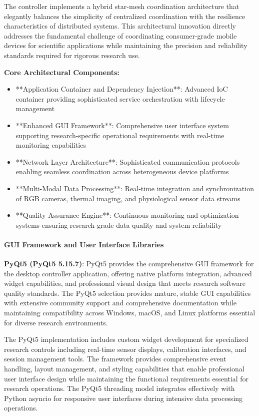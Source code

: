 \documentclass[12pt,a4paper]{report}
\begin{document}
The controller implements a hybrid star-mesh coordination architecture that elegantly balances the simplicity of
centralized coordination with the resilience characteristics of distributed systems. This architectural innovation
directly addresses the fundamental challenge of coordinating consumer-grade mobile devices for scientific applications
while maintaining the precision and reliability standards required for rigorous research use.

\textbf{Core Architectural Components:}

\begin{itemize}
\item **Application Container and Dependency Injection**: Advanced IoC container providing sophisticated service
  orchestration with lifecycle management
\item **Enhanced GUI Framework**: Comprehensive user interface system supporting research-specific operational requirements
  with real-time monitoring capabilities
\item **Network Layer Architecture**: Sophisticated communication protocols enabling seamless coordination across
  heterogeneous device platforms
\item **Multi-Modal Data Processing**: Real-time integration and synchronization of RGB cameras, thermal imaging, and
  physiological sensor data streams
\item **Quality Assurance Engine**: Continuous monitoring and optimization systems ensuring research-grade data quality and
  system reliability

\end{itemize}
\paragraph{GUI Framework and User Interface Libraries}

\textbf{PyQt5 (PyQt5 5.15.7)}: PyQt5 provides the comprehensive GUI framework for the desktop controller application,
offering native platform integration, advanced widget capabilities, and professional visual design that meets research
software quality standards. The PyQt5 selection provides mature, stable GUI capabilities with extensive community
support and comprehensive documentation while maintaining compatibility across Windows, macOS, and Linux platforms
essential for diverse research environments.

The PyQt5 implementation includes custom widget development for specialized research controls including real-time sensor
displays, calibration interfaces, and session management tools. The framework provides comprehensive event handling,
layout management, and styling capabilities that enable professional user interface design while maintaining the
functional requirements essential for research operations. The PyQt5 threading model integrates effectively with Python
asyncio for responsive user interfaces during intensive data processing operations.
\end{document}
